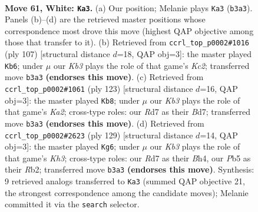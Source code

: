 \documentclass[11pt]{article}
\begin{document}
\clearpage

\begin{figure}[p]\centering
\begin{subfigure}{0.46\textwidth}\centering
\resizebox{\linewidth}{!}{%
\newchessgame
\chessboard[
  setfen={8/3R4/7k/1P6/P5n1/1K6/7r/8 w - - 8 61},
  showmover=false,
  pgfstyle=straightmove, color=movearrow, markmove={b3-a3}
]}
\caption{}
\end{subfigure}\hfill
\begin{subfigure}{0.46\textwidth}\centering
\resizebox{\linewidth}{!}{%
\newchessgame
\chessboard[
  setfen={8/2k5/6p1/4p3/4N3/7r/5K2/3R4 b - - 6 54},
  showmover=false,
  pgfstyle=straightmove, color=movearrow, markmove={c7-b6}
]}
\caption{}
\end{subfigure}
\\[4pt]
\begin{subfigure}{0.46\textwidth}\centering
\resizebox{\linewidth}{!}{%
\newchessgame
\chessboard[
  setfen={8/kp1b4/7r/3N4/1K3P2/4R3/8/8 b - - 2 62},
  showmover=false,
  pgfstyle=straightmove, color=movearrow, markmove={a7-b8}
]}
\caption{}
\end{subfigure}\hfill
\begin{subfigure}{0.46\textwidth}\centering
\resizebox{\linewidth}{!}{%
\newchessgame
\chessboard[
  setfen={8/1p6/7k/5R2/7b/4N3/1r6/3K4 b - - 1 65},
  showmover=false,
  pgfstyle=straightmove, color=movearrow, markmove={h6-g6}
]}
\caption{}
\end{subfigure}
\caption{\textbf{Move 61, White: \texttt{Ka3}.} (a) Our position; Melanie plays \texttt{Ka3} (\texttt{b3a3}). Panels (b)--(d) are the retrieved master positions whose correspondence most drove this move (highest QAP objective among those that transfer to it). (b) Retrieved from \texttt{ccrl\_top\_p0002\#1016} (ply 107) [structural distance $d$=18, QAP obj=3]: the master played \texttt{Kb6}; under $\mu$ our \emph{Kb3} plays the role of that game's \emph{Kc2}; transferred move \texttt{b3a3} \textbf{(endorses this move)}. (c) Retrieved from \texttt{ccrl\_top\_p0002\#1061} (ply 123) [structural distance $d$=16, QAP obj=3]: the master played \texttt{Kb8}; under $\mu$ our \emph{Kb3} plays the role of that game's \emph{Ka2}; cross-type roles: our \emph{R}d7 as their \emph{B}d7; transferred move \texttt{b3a3} \textbf{(endorses this move)}. (d) Retrieved from \texttt{ccrl\_top\_p0002\#2623} (ply 129) [structural distance $d$=14, QAP obj=3]: the master played \texttt{Kg6}; under $\mu$ our \emph{Kb3} plays the role of that game's \emph{Kh3}; cross-type roles: our \emph{R}d7 as their \emph{B}h4, our \emph{P}b5 as their \emph{R}b2; transferred move \texttt{b3a3} \textbf{(endorses this move)}. Synthesis: 9 retrieved analogs transferred to \texttt{Ka3} (summed QAP objective 21, the strongest correspondence among the candidate moves); Melanie committed it via the \texttt{search} selector.}
\label{fig:thought-m120}
\end{figure}
\end{document}
